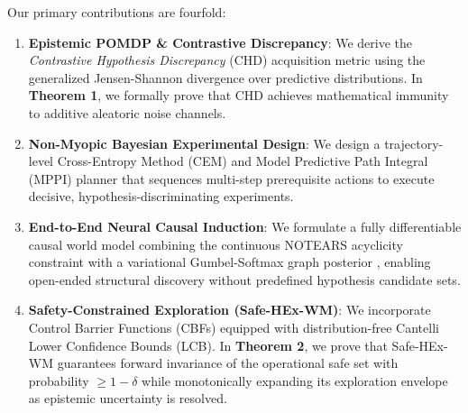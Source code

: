 Our primary contributions are fourfold:
\begin{enumerate}
    \item \textbf{Epistemic POMDP \& Contrastive Discrepancy}: We derive the \emph{Contrastive Hypothesis Discrepancy} (CHD) acquisition metric using the generalized Jensen-Shannon divergence over predictive distributions. In \textbf{Theorem 1}, we formally prove that CHD achieves mathematical immunity to additive aleatoric noise channels.
    \item \textbf{Non-Myopic Bayesian Experimental Design}: We design a trajectory-level Cross-Entropy Method (CEM) and Model Predictive Path Integral (MPPI) planner that sequences multi-step prerequisite actions to execute decisive, hypothesis-discriminating experiments.
    \item \textbf{End-to-End Neural Causal Induction}: We formulate a fully differentiable causal world model combining the continuous NOTEARS acyclicity constraint \citep{zheng2018dags} with a variational Gumbel-Softmax graph posterior \citep{jang2017categorical}, enabling open-ended structural discovery without predefined hypothesis candidate sets.
    \item \textbf{Safety-Constrained Exploration (Safe-HEx-WM)}: We incorporate Control Barrier Functions (CBFs) \citep{ames2019control} equipped with distribution-free Cantelli Lower Confidence Bounds (LCB). In \textbf{Theorem 2}, we prove that Safe-HEx-WM guarantees forward invariance of the operational safe set with probability $\ge 1 - \delta$ while monotonically expanding its exploration envelope as epistemic uncertainty is resolved.
\end{enumerate}
